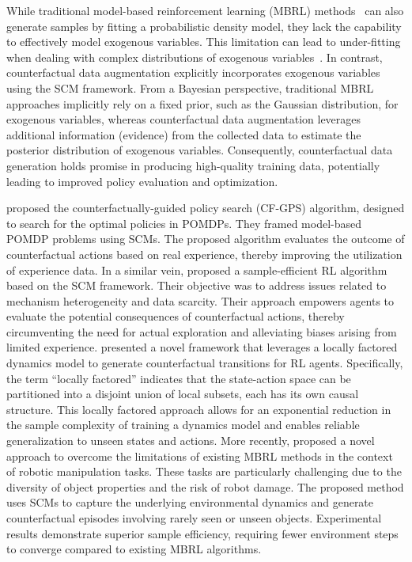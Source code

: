 \documentclass[10pt]{article} %
\theoremstyle{definition}
\begin{document}
While traditional model-based reinforcement learning (MBRL) methods~\citep{wangBenchmarkingModelBasedReinforcement2019, luoSurveyModelbasedReinforcement2022a} can also generate samples by fitting a probabilistic density model, they lack the capability to effectively model exogenous variables. This limitation can lead to under-fitting when dealing with complex distributions of exogenous variables~\citep{buesingWouldaCouldaShoulda2019a}. In contrast, counterfactual data augmentation explicitly incorporates exogenous variables using the SCM framework. From a Bayesian perspective, traditional MBRL approaches implicitly rely on a fixed prior, such as the Gaussian distribution, for exogenous variables, whereas counterfactual data augmentation leverages additional information (evidence) from the collected data to estimate the posterior distribution of exogenous variables. Consequently, counterfactual data generation holds promise in producing high-quality training data, potentially leading to improved policy evaluation and optimization.

\citet{buesingWouldaCouldaShoulda2019a} proposed the counterfactually-guided policy search (CF-GPS) algorithm, designed to search for the optimal policies in POMDPs. They framed model-based POMDP problems using SCMs. The proposed algorithm evaluates the outcome of counterfactual actions based on real experience, thereby improving the utilization of experience data.
In a similar vein, \citet{luSampleEfficientReinforcementLearning2020a} proposed a sample-efficient RL algorithm based on the SCM framework. Their objective was to address issues related to mechanism heterogeneity and data scarcity. Their approach empowers agents to evaluate the potential consequences of counterfactual actions, thereby circumventing the need for actual exploration and alleviating biases arising from limited experience.
\citet{pitisCounterfactualDataAugmentation2020a} presented a novel framework that leverages a locally factored dynamics model to generate counterfactual transitions for RL agents.  Specifically, the term ``locally factored'' indicates that the state-action space can be partitioned into a disjoint union of local subsets, each has its own causal structure. This locally factored approach allows for an exponential reduction in the sample complexity of training a dynamics model and enables reliable generalization to unseen states and actions.
More recently, \citet{zhuCausalDynaImprovingGeneralization2021a} proposed a novel approach to overcome the limitations of existing MBRL methods in the context of robotic manipulation tasks. These tasks are particularly challenging due to the diversity of object properties and the risk of robot damage. The proposed method uses SCMs to capture the underlying environmental dynamics and generate counterfactual episodes involving rarely seen or unseen objects. Experimental results demonstrate superior sample efficiency, requiring fewer environment steps to converge compared to existing MBRL algorithms.
\end{document}
